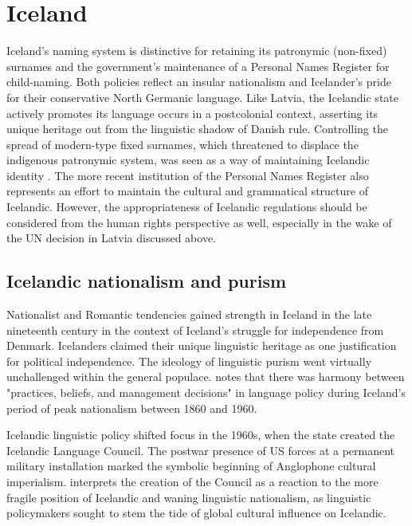 \section{Iceland}

Iceland's naming system is distinctive for retaining its patronymic (non-fixed)
surnames and the government's maintenance of a Personal Names Register for
child-naming. Both policies reflect an insular nationalism and Icelander's
pride for their conservative North Germanic language. Like Latvia, the
Icelandic state actively promotes its language occurs in a postcolonial
context, asserting its unique heritage out from the linguistic shadow of Danish
rule. Controlling the spread of modern-type fixed surnames, which threatened to
displace the indigenous patronymic system, was seen as a way of maintaining
Icelandic identity \parencite{willson02}. The more recent institution of the
Personal Names Register also represents an effort to maintain the cultural and
grammatical structure of Icelandic. However, the appropriateness of Icelandic
regulations should be considered from the human rights perspective as well,
especially in the wake of the UN decision in Latvia discussed above.

\subsection{Icelandic nationalism and purism}

Nationalist and Romantic tendencies gained strength in Iceland in the late
nineteenth century in the context of Iceland's struggle for independence from
Denmark. Icelanders claimed their unique linguistic heritage as one
justification for political independence. The ideology of linguistic purism
went virtually unchallenged within the general populace.
\textcite{kristinsson12} notes that there was harmony between "practices,
beliefs, and management decisions" in language policy during Iceland's period
of peak nationalism between 1860 and 1960.

Icelandic linguistic policy shifted focus in the 1960s, when the state created
the Icelandic Language Council. The postwar presence of US forces at a
permanent military installation marked the symbolic beginning of Anglophone
cultural imperialism. \textcite{kristinsson12} interprets the creation of the
Council as a reaction to the more fragile position of Icelandic and waning
linguistic nationalism, as linguistic policymakers sought to stem the tide of
global cultural influence on Icelandic.

